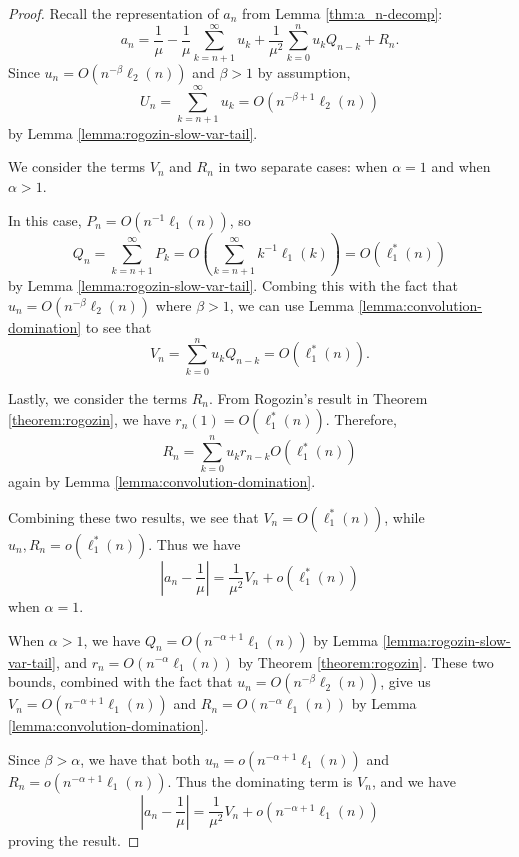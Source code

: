 \begin{proof}
    Recall the representation of $a_n$ from Lemma \ref{thm:a_n-decomp}:
    \[
       a_n = \frac{1}{\mu}
           - \frac{1}{\mu}\sum_{k=n+1}^\infty u_k
           + \frac{1}{\mu^2} \sum_{k=0}^n u_k Q_{n-k}
           + R_n.
    \]
    Since $u_n =  O(n^{-\beta}\ell_2(n))$ and $\beta > 1$ by assumption,
    \[
        U_n = \sum_{k=n+1}^\infty u_k = O(n^{-\beta+1}\ell_2(n))
    \]
    by Lemma \ref{lemma:rogozin-slow-var-tail}.

    We consider the terms $V_n$ and $R_n$ in two separate cases: when $\alpha = 1$ and when $\alpha > 1$.

    In this case, $P_n = O(n^{-1}\ell_1(n))$,
    so
    \[
        Q_n = \sum_{k=n+1}^\infty P_k = O\left(\sum_{k=n+1}^\infty k^{-1}\ell_1(k)\right) = O(\ell_1^*(n))
    \]
    by Lemma \ref{lemma:rogozin-slow-var-tail}.
    Combing this with the fact that $u_n = O(n^{-\beta}\ell_2(n))$ where $\beta > 1$,
    we can use Lemma \ref{lemma:convolution-domination} to see that
    \[
        V_n = \sum_{k=0}^n u_k Q_{n-k} = O(\ell_1^*(n)).
    \]

    Lastly, we consider the terms $R_n$.
    From Rogozin's result in Theorem \ref{theorem:rogozin},
    we have $r_n(1) = O(\ell_1^*(n))$.
    Therefore,
    \[
        R_n = \sum_{k=0}^n u_k r_{n-k}O(\ell_1^*(n))
    \]
    again by Lemma \ref{lemma:convolution-domination}.

    Combining these two results,
    we see that $V_n = O(\ell_1^*(n))$, while $u_n, R_n = o(\ell_1^*(n))$.
    Thus we have
    \[
        \left|a_n - \frac{1}{\mu}\right| = \frac{1}{\mu^2}V_n + o\left(\ell_1^*(n)\right)
    \]
    when $\alpha = 1$.

    When $\alpha > 1$, we have $Q_n = O(n^{-\alpha+1}\ell_1(n))$ by Lemma \ref{lemma:rogozin-slow-var-tail},
    and $r_n = O(n^{-\alpha}\ell_1(n))$ by Theorem \ref{theorem:rogozin}.
    These two bounds, combined with the fact that $u_n = O(n^{-\beta}\ell_2(n))$, give us
    $V_n = O(n^{-\alpha+1}\ell_1(n))$ and $R_n = O(n^{-\alpha}\ell_1(n))$ by Lemma \ref{lemma:convolution-domination}.
    
    Since $\beta > \alpha$,
    we have that both $u_n = o(n^{-\alpha+1}\ell_1(n))$ and $R_n = o(n^{-\alpha+1}\ell_1(n))$.
    Thus the dominating term is $V_n$, and we have
    \[
        \left|a_n - \frac{1}{\mu}\right| = \frac{1}{\mu^2}V_n + o\left(n^{-\alpha+1}\ell_1(n)\right)
    \]
    proving the result.
\end{proof}

